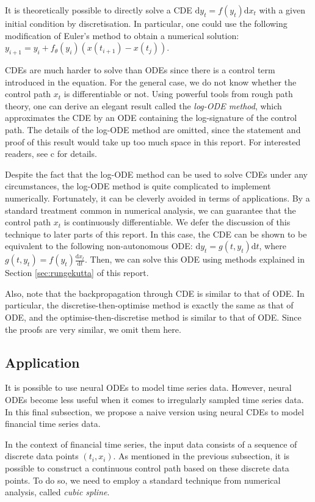 \documentclass[a4paper,11pt,titlepage]{article}
\theoremstyle{definition}
\theoremstyle{plain}
\theoremstyle{remark}
\begin{document}
It is theoretically possible to directly solve a CDE $\mathrm{d}y_t = f(y_t)\mathrm{d}x_t$ with a given initial condition by discretisation. In particular, one could use the following modification of Euler's method to obtain a numerical solution: $y_{i+1}=y_i+f_\theta(y_i)(x(t_{i+1})-x(t_j))$.

CDEs are much harder to solve than ODEs since there is a control term introduced in the equation. For the general case, we do not know whether the control path $x_t$ is differentiable or not. Using powerful tools from rough path theory, one can derive an elegant result called the \textit{log-ODE method}, which approximates the CDE by an ODE containing the log-signature of the control path. The details of the log-ODE method are omitted, since the statement and proof of this result would take up too much space in this report. For interested readers, see c for details.

Despite the fact that the log-ODE method can be used to solve CDEs under any circumstances, the log-ODE method is quite complicated to implement numerically. Fortunately, it can be cleverly avoided in terms of applications. By a standard treatment common in numerical analysis, we can guarantee that the control path $x_t$ is continuously differentiable. We defer the discussion of this technique to later parts of this report. In this case, the CDE can be shown to be equivalent to the following non-autonomous ODE: $\mathrm{d}y_t=g(t,y_t)\mathrm{d}t$, where $g(t,y_t)=f(y_t)\frac{\mathrm{d}x_t}{\mathrm{d}t}$. Then, we can solve this ODE using methods explained in Section \ref{sec:rungekutta} of this report.

Also, note that the backpropagation through CDE is similar to that of ODE. In particular, the discretise-then-optimise method is exactly the same as that of ODE, and the optimise-then-discretise method is similar to that of ODE. Since the proofs are very similar, we omit them here.

\subsection{Application}

It is possible to use neural ODEs to model time series data. However, neural ODEs become less useful when it comes to irregularly sampled time series data. In this final subsection, we propose a naive version using neural CDEs to model financial time series data.

In the context of financial time series, the input data consists of a sequence of discrete data points $\left(t_i,x_i\right)$. As mentioned in the previous subsection, it is possible to construct a continuous control path based on these discrete data points. To do so, we need to employ a standard technique from numerical analysis, called \textit{cubic spline}. 
\end{document}

